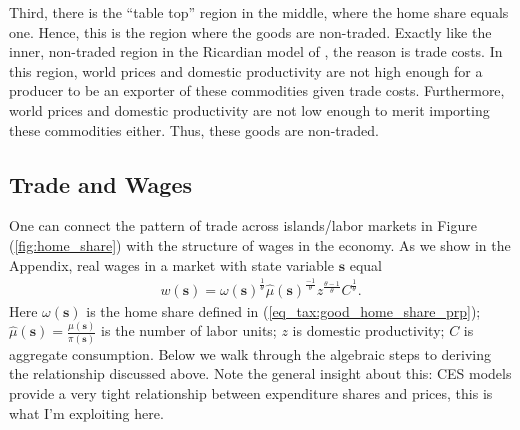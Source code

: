 \documentclass[pdftex,12pt]{article}
\begin{document}
\medskip
\noindent Third, there is the ``table top'' region in the middle, where the home share equals one. Hence, this is the region where the goods are non-traded. Exactly like the inner, non-traded region in the Ricardian model of \citet{dornbusch1977comparative}, the reason is trade costs. In this region, world prices and domestic productivity are not high enough for a producer to be an exporter of these commodities given trade costs. Furthermore, world prices and domestic productivity are not low enough to merit importing these commodities either. Thus, these goods are non-traded.

\subsection{Trade and Wages}

One can connect the pattern of trade across islands/labor markets in Figure (\ref{fig:home_share}) with the structure of wages in the economy. As we show in the Appendix, real wages in a market with state variable $\textbf{s}$ equal
\begin{align}
 w(\textbf{s}) = \omega(\textbf{s})^{\frac{1}{\theta}} \hat \mu( \textbf{s})^{\frac{-1}{\theta}}z^{\frac{\theta-1}{\theta}} C^{\frac{1}{\theta}}.
 \label{eq_tax:wage_home_share_prp}
\end{align}
Here $\omega(\textbf{s})$ is the home share defined in (\ref{eq_tax:good_home_share_prp}); $\hat \mu( \textbf{s}) = \frac{\mu(\textbf{s})}{\pi(\textbf{s})}$ is the number of labor units;  $z$ is domestic productivity; $C$ is aggregate consumption. Below we walk through the algebraic steps to deriving the relationship discussed above. Note the general insight about this: CES models provide a very tight relationship between expenditure shares and prices, this is what I'm exploiting here.
\end{document}
